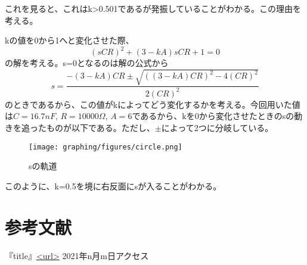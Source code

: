 \documentclass{ltjsarticle}
\begin{document}
これを見ると、これはk>0.501であるが発振していることがわかる。この理由を考える。

kの値を0から1へと変化させた際、
$$
(sCR)^2 + (3-kA)sCR + 1 = 0
$$
の解を考える。s=0となるのは解の公式から
$$
s = \frac{-(3-kA)CR \pm \sqrt{((3-kA)CR)^2 - 4(CR)^2}}{2(CR)^2}
$$
のときであるから、この値がkによってどう変化するかを考える。今回用いた値は$C = 16.7nF$, $R = 10000\Omega$, $A=6$であるから、kを0から変化させたときのsの動きを追ったものが以下である。ただし、$\pm$によって2つに分岐している。
\begin{figure}[H]
    \begin{center}
        \texttt{[image: graphing/figures/circle.png]}
        \caption{sの軌道}
    \end{center}
\end{figure}
このように、k=0.5を境に右反面にsが入ることがわかる。

\section{参考文献}
『title』\url{<url>} 2021年n月m日アクセス
\end{document}

